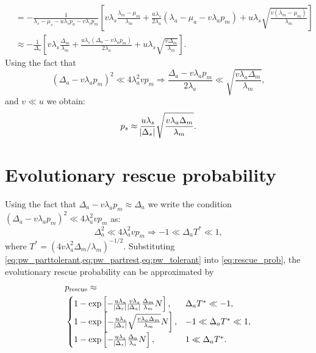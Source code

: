 \documentclass[12pt]{extarticle}
\newcommand{\presc}{p_\text{rescue}}
\begin{document}
\begin{appendices}
\begin{equation}
\begin{aligned}
&=-\frac{1}{\lambda_s-\mu_s-u\lambda_sp_a-v\lambda_sp_m}\left[v\lambda_s\frac{\lambda_m-\mu_m} {\lambda_m}+\frac{u\lambda_s}{2\lambda_a}\left(\lambda_a-\mu_a-v\lambda_ap_m\right)+u\lambda_s\sqrt{\frac{v\left(\lambda_m-\mu_m\right)}{\lambda_m}}\right]\\ %
&\approx-\frac{1}{\Delta_s}\left[v\lambda_s\frac{\Delta_m}{\lambda_m}+\frac{u\lambda_s\left(\Delta_a-v\lambda_ap_m\right)}{2\lambda_a}+u\lambda_s\sqrt{\frac{v\Delta_m}{\lambda_m}}\right]. %
\end{aligned}
\end{equation}
Using the fact that
\begin{equation*}
\left(\Delta_a-v\lambda_ap_m\right)^2 \ll 4\lambda_a^2vp_m\Rightarrow\frac{\Delta_a-v\lambda_ap_m}{2\lambda_a} \ll \sqrt{\frac{v\lambda_a\Delta_m}{\lambda_m}},
\end{equation*}
and $v\ll u$ we obtain:
\begin{equation}\label{eq:pw_partrest}
p_s\approx\frac{u\lambda_s}{\abs{\Delta_s}} \sqrt{\frac{v\lambda_a\Delta_m}{\lambda_m}}.
\end{equation}

\section{Evolutionary rescue probability}\label{sec:appendix-rescue-prob}
Using the fact that $\Delta_a-v\lambda_ap_m\approx\Delta_a$ we write the condition $\left(\Delta_a-v\lambda_ap_m\right)^2 \ll 4\lambda_a^2vp_m$ as:
\begin{equation*}
\Delta_a^2 \ll 4\lambda_a^2vp_m\Rightarrow -1\ll\Delta_aT^*\ll1,
\end{equation*}
where $T^* = (4 v \lambda_a^2 \Delta_m/\lambda_m)^{-1/2}$.
Substituting \cref{eq:pw_parttolerant,eq:pw_partrest,eq:pw_tolerant} into \cref{eq:rescue_prob}, the evolutionary rescue probability can be approximated by
\begin{equation}\label{rescue_prob_approx}
\begin{aligned}
&\presc \approx \\
  &\begin{cases}
   1-\exp\left[-\frac{u\lambda_a}{\abs{\Delta_s}} \frac{v\lambda_s}{\abs{\Delta_a}} \frac{\Delta_m}{\lambda_m}  N\right] ,&
   \Delta_aT^*\ll-1 ,\\
   1-\exp\left[-\frac{u\lambda_s}{\abs{\Delta_s}} \sqrt{\frac{v\lambda_a\Delta_m}{\lambda_m}} N\right] ,&
  -1\ll\Delta_aT^*\ll1 ,\\
   1-\exp\left[-\frac{u\lambda_s}{\abs{\Delta_s}}  \frac{\Delta_a}{\lambda_a}  N\right] ,&
   1\ll\Delta_aT^*.
  \end{cases}
\end{aligned}
\end{equation}


\end{appendices}
\end{document}
